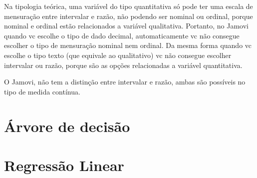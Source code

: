 \documentclass[a4paper,12pt]{book}
\begin{document}
Na tipologia teórica, uma variável do tipo quantitativa só pode ter uma escala de mensuração entre intervalar e razão, não podendo ser nominal ou ordinal, porque nominal e ordinal estão relacionados a variável qualitativa. Portanto, no Jamovi quando vc escolhe o tipo de dado decimal, automaticamente vc não consegue escolher o tipo de mensuração nominal nem ordinal. Da mesma forma quando vc escolhe o tipo texto (que equivale ao qualitativo) vc não consegue escolher intervalar ou razão, porque são as opções relacionadas a variável quantitativa.

O Jamovi, não tem a distinção entre intervalar e razão, ambas são possíveis no tipo de medida contínua.

\chapter{Árvore de decisão}


\chapter{Regressão Linear}




\end{document}
